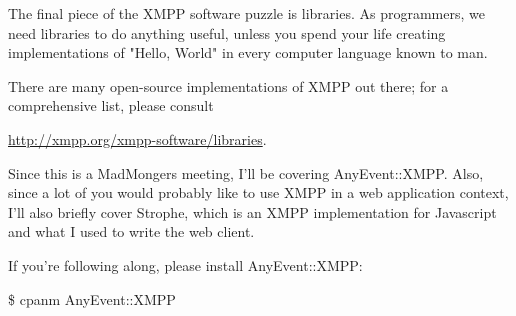 The final piece of the XMPP software puzzle is libraries.  As programmers, we need
libraries to do anything useful, unless you spend your life creating implementations of
"Hello, World" in every computer language known to man.

\pause
There are many open-source implementations of XMPP out there; for a comprehensive list,
please consult

\url{http://xmpp.org/xmpp-software/libraries}.

\newpage
Since this is a MadMongers meeting, I'll be covering AnyEvent::XMPP.  Also, since a lot
of you would probably like to use XMPP in a web application context, I'll also briefly cover
Strophe, which is an XMPP implementation for Javascript and what I used to write the web
client.

\pause

If you're following along, please install AnyEvent::XMPP:

\begin{shaded}
\$ cpanm AnyEvent::XMPP
\end{shaded}
